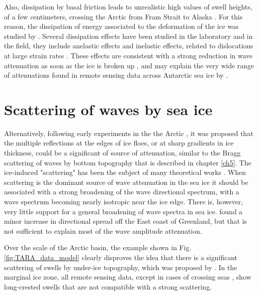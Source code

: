 Also, dissipation by basal friction leads to unrealistic high values of swell heights, of a few centimeters, crossing the Arctic from Fram Strait to Alaska \citep{Ardhuin&al.2016}. For this reason, the dissipation of energy associated to the deformation of the ice was studied by \cite{Ardhuin&al.2018b,Boutin&al.2018,Ardhuin&al.2020}. Several dissipation effects have been studied in the laboratory and in the field, they include anelastic effects \cite{Cole1995,Cole&al.1998} and inelastic effects, related to dislocations at large strain rates \citep{Cole&Durell2001}.  These effects are consistent with a strong reduction in wave attenuation as soon as the ice is broken up  \citep{Ardhuin&al.2020}, and may explain the very wide range of attenuations found in 
remote sensing data across Antarctic sea ice by \cite{Stopa&al.2018b}. 



\section{Scattering of waves by sea ice}
Alternatively, following early experiments in the the Arctic \citep{Wadhams&al.1986}, it was proposed that the multiple reflections at the edges of ice floes, or at sharp gradients in ice thickness, could be a significant of source of attenuation, similar to the Bragg scattering of waves by bottom topography that is described in chapter \ref{ch5}. The ice-induced "scattering" has been the subject of many theoretical works \citep{Squire2020}. When scattering is the dominant source of wave attenuation in the sea ice it should be associated with a strong broadening of the wave directional spectrum, with a wave spectrum becoming nearly isotropic near the ice edge.  There is, however, very little support for a general broadening of wave spectra in sea ice.  \cite{Sutherland&Gascard2016} found a minor increase in directional spread off the East coast of Greenland, but that is not sufficient to explain most of the wave amplitude attenuation. 

Over the scale of the Arctic basin, the example shown in Fig. \ref{fig:TARA_data_model} clearly disproves the idea that there is a significant scattering of swells by under-ice topography, which was proposed by \cite{Squire&al.2009}. In the marginal ice zone, all remote sensing data, except in cases of crossing seas \citep{Ardhuin&al.2015b}, show long-crested swells that are not compatible with a strong scattering. 


